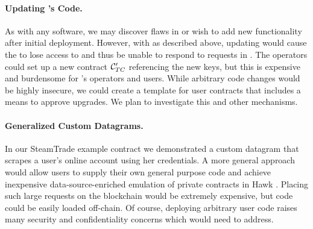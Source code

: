\paragraph{Updating \tc's Code.}
As with any software, we may discover flaws in \tc or wish to add new functionality after initial deployment.
However, with \tc as described above, updating \engine would cause the \encname to lose access to \skTC and thus be unable to respond to requests in \tcont.
The \tc operators could set up a new contract $\tcont'$ referencing the new keys, but this is expensive and burdensome for \tc's operators and users.
While arbitrary code changes would be highly insecure, we could create a template for user contracts that includes a means to approve upgrades.
We plan to investigate this and other mechanisms.

\paragraph{Generalized Custom Datagrams.}
In our {\sf SteamTrade} example contract we demonstrated a custom datagram that scrapes a user's online account using her credentials.
A more general approach would allow users to supply their own general purpose code and achieve inexpensive data-source-enriched emulation of private contracts in Hawk \cite{hawk}.
Placing such large requests on the blockchain would be extremely expensive, but code could be easily loaded off-chain.
Of course, deploying arbitrary user code raises many security and confidentiality concerns which \tc would need to address.

